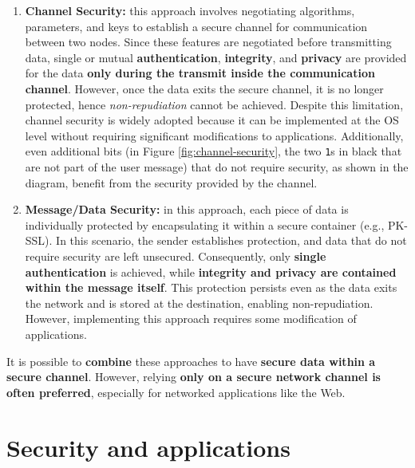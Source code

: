 \begin{enumerate}
	\item \textbf{Channel Security:} this approach involves negotiating algorithms, parameters, and keys to establish a secure channel for communication between two nodes. Since these features are negotiated before transmitting data, single or mutual \textbf{authentication}, \textbf{integrity}, and \textbf{privacy} are provided for the data \textbf{only during the transmit inside the communication channel}. However, once the data exits the secure channel, it is no longer protected, hence \textit{non-repudiation} cannot be achieved. Despite this limitation, channel security is widely adopted because it can be implemented at the OS level without requiring significant modifications to applications.
	      Additionally, even additional bits (in Figure \ref*{fig:channel-security}, the two \texttt{1}s in black that are not part of the user message) that do not require security, as shown in the diagram, benefit from the security provided by the channel.

	\item \textbf{Message/Data Security:} in this approach, each piece of data is individually protected by encapsulating it within a secure container (e.g., PK-SSL). In this scenario, the sender establishes protection, and data that do not require security are left unsecured. Consequently, only \textbf{single authentication} is achieved, while \textbf{integrity and privacy are contained within the message itself}. This protection persists even as the data exits the network and is stored at the destination, enabling non-repudiation. However, implementing this approach requires some modification of applications.
\end{enumerate}

It is possible to \textbf{combine} these approaches to have \textbf{secure data within a secure channel}. However, relying \textbf{only on a secure network channel is often preferred}, especially for networked applications like the Web.


\section{Security and applications}


